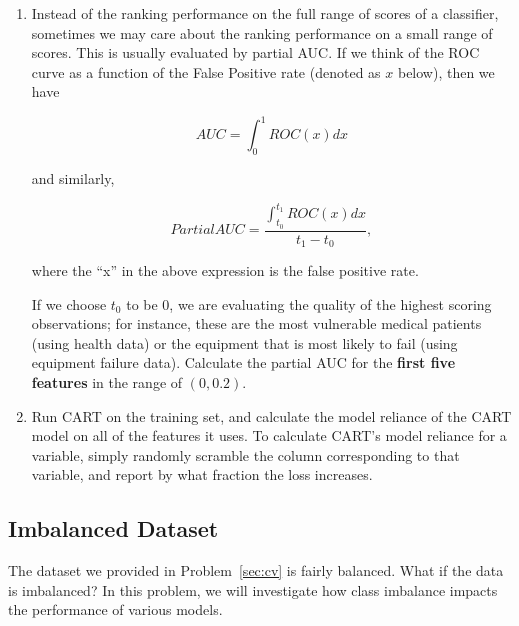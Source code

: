 \documentclass[11pt]{article}
\begin{document}
\begin{enumerate}[label=(\alph*)]
    \item Instead of the ranking performance on the full range of scores of a classifier, sometimes we may care about the ranking performance on a small range of scores. This is usually evaluated by partial AUC. If we think of the ROC curve as a function of the False Positive rate (denoted as $x$ below), then we have
    
    $$AUC = \int_{0}^{1} ROC(x) dx$$
    
    and similarly,
    
    $$Partial AUC = \frac{\int_{t_0}^{t_1} ROC(x) dx}{t_1-t_0},$$
    
    where the ``x'' in the above expression is the false positive rate.
    
    If we choose $t_0$ to be 0, we are evaluating the quality of the highest scoring observations; for instance, these are the most vulnerable medical patients (using health data) or the equipment that is most likely to fail (using equipment failure data).
    Calculate the partial AUC for the \textbf{first five features} in the range of $(0, 0.2)$. 
    
    \item Run CART on the training set, and calculate the model reliance of the CART model on all of the features it uses. To calculate CART's model reliance for a variable, simply randomly scramble the column corresponding to that variable, and report by what fraction the loss increases.

\end{enumerate}


\subsection{Imbalanced Dataset}\label{sec:imbalance}
The dataset we provided in Problem~\ref{sec:cv} is fairly balanced. What if the data is imbalanced? In this problem, we will investigate how class imbalance impacts the performance of various models.
\end{document}
